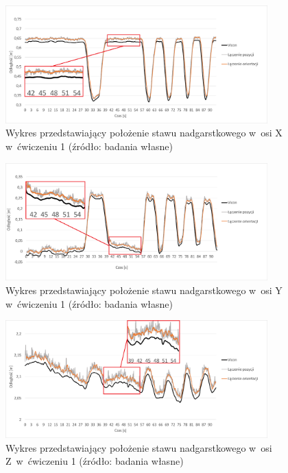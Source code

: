 \begin{figure}[!htb]
	\centering
	\includegraphics[width=0.9\textwidth]{images/100/Slide4.png}
	\caption{Wykres przedstawiający położenie stawu nadgarstkowego w~osi X w~ćwiczeniu 1 (źródło: badania własne)}
	\label{fig:experiments:first:wristX}
	 \vspace{-10pt}
\end{figure}
\begin{figure}[!htb]
	\centering
	\includegraphics[width=0.9\textwidth]{images/100/Slide5.png}
	\caption{Wykres przedstawiający położenie stawu nadgarstkowego w~osi Y w~ćwiczeniu 1 (źródło: badania własne)}
	\label{fig:experiments:first:wristY}
	 \vspace{-10pt}
\end{figure}
\begin{figure}[!htb]
	\centering
	\includegraphics[width=0.9\textwidth]{images/100/Slide6.png}
	\caption{Wykres przedstawiający położenie stawu nadgarstkowego w~osi Z~w~ćwiczeniu 1 (źródło: badania własne)}
	\label{fig:experiments:first:wristZ}
	 \vspace{-10pt}
\end{figure}
			
